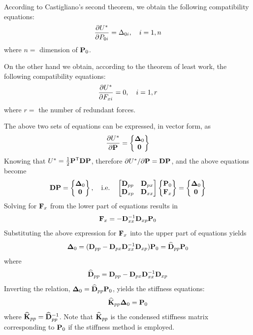 According to Castigliano's second theorem, we obtain the following compatibility equations:
\begin{equation}
  \frac{\partial U^*}{\partial P_{0i}} = \Delta_{0i},\quad i = 1, n
\end{equation}
where $n =$ dimension of $\mathbf{P}_0$.

On the other hand we obtain, according to the theorem of least work, the following compatibility equations:
\begin{equation}
  \frac{\partial U^*}{\partial F_{xi}} = 0,\quad i = 1, r
\end{equation}
where $r =$ the number of redundant forces.

The above two sets of equations can be expressed, in vector form, as
\begin{equation}
  \frac{\partial U^*}{\partial \mathbf{P}} = \begin{Bmatrix}\bm{\Delta}_0\\ \mathbf{0}\end{Bmatrix}
\end{equation}
Knowing that $U^* = \frac12\mathbf{P}^{\mathsf{T}}\mathbf{D}\mathbf{P}$, therefore $\partial U^*/\partial\mathbf{P} = \mathbf{D}\mathbf{P}$, and the above equations become
\begin{equation}
  \mathbf{D}\mathbf{P} = \begin{Bmatrix}\bm{\Delta}_0\\ \mathbf{0}\end{Bmatrix},\quad\text{i.e.}\quad
  \begin{bmatrix}\mathbf{D}_{pp} & \mathbf{D}_{px}\\ \mathbf{D}_{xp} & \mathbf{D}_{xx}\end{bmatrix}\begin{Bmatrix}\mathbf{P}_0\\ \mathbf{F}_x\end{Bmatrix} = \begin{Bmatrix}\bm{\Delta}_0\\ \mathbf{0}\end{Bmatrix}
\end{equation}
Solving for $\mathbf{F}_x$ from the lower part of equations results in
\begin{equation}
  \mathbf{F}_x = -\mathbf{D}_{xx}^{-1}\mathbf{D}_{xp}\mathbf{P}_0
\end{equation}
Substituting the above expression for $\mathbf{F}_x$ into the upper part of equations yields
\begin{equation}
  \bm{\Delta}_0 = (\mathbf{D}_{pp} - \mathbf{D}_{px}\mathbf{D}_{xx}^{-1}\mathbf{D}_{xp})\mathbf{P}_0 = \widehat{\mathbf{D}}_{pp}\mathbf{P}_0
\end{equation}
where
\begin{equation}
  \widehat{\mathbf{D}}_{pp} = \mathbf{D}_{pp} - \mathbf{D}_{px}\mathbf{D}_{xx}^{-1}\mathbf{D}_{xp}
\end{equation}
Inverting the relation, $\bm{\Delta}_0 = \widehat{\mathbf{D}}_{pp}\mathbf{P}_0$, yields the stiffness equations:
\begin{equation}
  \widehat{\mathbf{K}}_{pp}\bm{\Delta}_0 = \mathbf{P}_0
\end{equation}
where $\widehat{\mathbf{K}}_{pp} = \widehat{\mathbf{D}}_{pp}^{-1}$. Note that $\widehat{\mathbf{K}}_{pp}$ is the condensed stiffness matrix corresponding to $\mathbf{P}_0$ if the stiffness method is employed.

